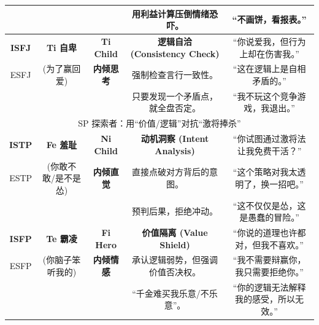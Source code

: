 \documentclass[UTF8,letter,10pt]{ctexart}
\begin{document}
\begin{table}[h!]
{\begin{tabular}{ccccc}
& & & 用利益计算压倒情绪恐吓。 & ``不画饼，看报表。''\tabularnewline
\midrule
\textbf{ISFJ} & \textbf{Ti 自卑} & \textbf{Ti Child} & \textbf{逻辑自洽 (Consistency Check)} & ``你说爱我，但行为上却在伤害我。''\tabularnewline
ESFJ & (为了赢回爱) & \textbf{内倾思考} & 强制检查言行一致性。 & ``这在逻辑上是自相矛盾的。''\tabularnewline
& & & 只要发现一个矛盾点，就全盘否定。 & ``我不玩这个竞争游戏，我退出。''\tabularnewline
\midrule
\multicolumn{5}{c}{SP 探索者：用``价值/逻辑''对抗``激将捧杀''}\tabularnewline
\midrule
\textbf{ISTP} & \textbf{Fe 羞耻} & \textbf{Ni Child} & \textbf{动机洞察 (Intent Analysis)} & ``你试图通过激将法让我免费干活？''\tabularnewline
ESTP & (你敢不敢/是不是怂) & \textbf{内倾直觉} & 直接点破对方背后的意图。 & ``这个策略对我太透明了，换一招吧。''\tabularnewline
& & & 预判后果，拒绝冲动。 & ``这不仅仅是怂，这是愚蠢的冒险。''\tabularnewline
\midrule
\textbf{ISFP} & \textbf{Te 霸凌} & \textbf{Fi Hero} & \textbf{价值隔离 (Value Shield)} & ``你说的道理也许都对，但我不喜欢。''\tabularnewline
ESFP & (你脑子笨听我的) & \textbf{内倾情感} & 承认逻辑弱势，但强调价值否决权。 & ``我不需要辩赢你，我只需要拒绝你。''\tabularnewline
& & & ``千金难买我乐意/不乐意''。 & ``你的逻辑无法解释我的感受，所以无效。''\tabularnewline
\bottomrule
\end{tabular}}
\end{table}
\end{document}
